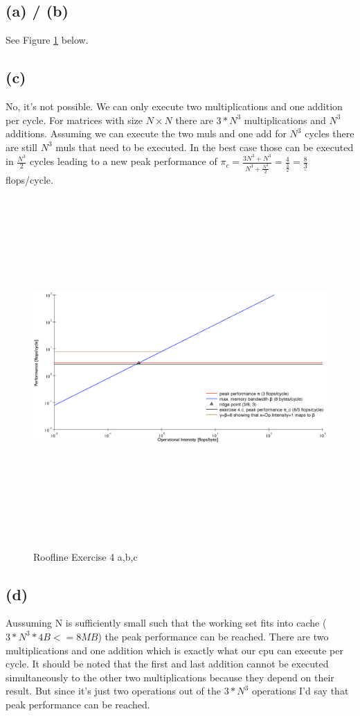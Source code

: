 \documentclass[10pt,a4paper,oneside,notitlepage]{report}
\begin{document}
\subsection*{(a) / (b)}

See Figure \ref{roofline_plot} below.

\subsection*{(c)}
No, it's not possible. We can only execute two multiplications and one addition per cycle. For matrices with size $N \times N$ there are $3*N^3$ multiplications and $N^3$ additions. Assuming we can execute the two muls and one add for $N^3$ cycles there are still $N^3$ muls that need to be executed. In the best case those can be executed in $\frac{N^3}{2}$ cycles leading to a new peak performance of $\pi_c= \frac{3N^3 + N^3}{N^3 + \frac{N^3}{2}}=\frac{4}{\frac{3}{2}}=\underline{\frac{8}{3}}$ flops/cycle.

\begin{landscape}
\begin{figure}[H]
\caption{Roofline Exercise 4 a,b,c}
\includegraphics[height=13cm]{roofline}
\label{roofline_plot}
\end{figure}
\end{landscape}

\subsection*{(d)}
Aussuming N is sufficiently small such that the working set fits into cache ($3*N^3*4B<=8MB$) the peak performance can be reached. There are two multiplications and one addition which is exactly what our cpu can execute per cycle.
It should be noted that the first and last addition cannot be executed simultaneously to the other two multiplications because they depend on their result. But since it's just two operations out of the $3*N^3$ operations I'd say that peak performance can be reached.
\end{document}
